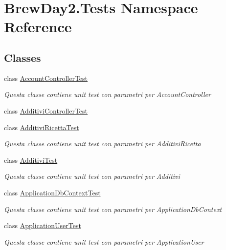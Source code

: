 \hypertarget{namespace_brew_day2_1_1_tests}{}\section{Brew\+Day2.\+Tests Namespace Reference}
\label{namespace_brew_day2_1_1_tests}
\subsection*{Classes}
\begin{DoxyCompactItemize}
\item 
class \mbox{\hyperlink{class_brew_day2_1_1_tests_1_1_account_controller_test}{Account\+Controller\+Test}}
\begin{DoxyCompactList}\small\item\em Questa classe contiene unit test con parametri per Account\+Controller\end{DoxyCompactList}\item 
class \mbox{\hyperlink{class_brew_day2_1_1_tests_1_1_additivi_controller_test}{Additivi\+Controller\+Test}}
\item 
class \mbox{\hyperlink{class_brew_day2_1_1_tests_1_1_additivi_ricetta_test}{Additivi\+Ricetta\+Test}}
\begin{DoxyCompactList}\small\item\em Questa classe contiene unit test con parametri per Additivi\+Ricetta\end{DoxyCompactList}\item 
class \mbox{\hyperlink{class_brew_day2_1_1_tests_1_1_additivi_test}{Additivi\+Test}}
\begin{DoxyCompactList}\small\item\em Questa classe contiene unit test con parametri per Additivi\end{DoxyCompactList}\item 
class \mbox{\hyperlink{class_brew_day2_1_1_tests_1_1_application_db_context_test}{Application\+Db\+Context\+Test}}
\begin{DoxyCompactList}\small\item\em Questa classe contiene unit test con parametri per Application\+Db\+Context\end{DoxyCompactList}\item 
class \mbox{\hyperlink{class_brew_day2_1_1_tests_1_1_application_user_test}{Application\+User\+Test}}
\begin{DoxyCompactList}\small\item\em Questa classe contiene unit test con parametri per Application\+User\end{DoxyCompactList}\item 

\end{DoxyCompactItemize}
